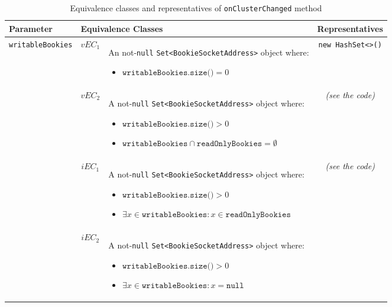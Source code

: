 \documentclass[sigconf]{acmart}
\begin{document}
\begin{table*}
\footnotesize
\caption{Equivalence classes and representatives of \texttt{onClusterChanged} method}
\label{onClusterChangedEq}
\centering
\begin{tabular}{l|cm{10.5cm}|c}
\toprule
 
\textbf{Parameter} & \multicolumn{2}{|l|}{\textbf{Equivalence Classes}} & \textbf{Representatives} \\
\midrule
    
\texttt{writableBookies} & $vEC_1$ & An not-\texttt{null} \texttt{Set<BookieSocketAddress>} object where:

\begin{itemize}
\item $\texttt{writableBookies.size()} = 0$
\end{itemize}

& \texttt{new HashSet<>()}

\\\cline{2-4}

& $vEC_2$ & A not-\texttt{null} \texttt{Set<BookieSocketAddress>} object where:
\begin{itemize}
\item $\texttt{writableBookies.size()} > 0$
\item $\texttt{writableBookies}  \cap \texttt{readOnlyBookies} = \emptyset$
\end{itemize}

& \textit{(see the code)}

\\\cline{2-4}

& $iEC_1$ & A not-\texttt{null} \texttt{Set<BookieSocketAddress>} object where:
\begin{itemize}
\item $\texttt{writableBookies.size()} > 0$
\item $\exists x \in \texttt{writableBookies} : x \in \texttt{readOnlyBookies}$
\end{itemize}

& \textit{(see the code)}

\\\cline{2-4}

& $iEC_2$ & A not-\texttt{null} \texttt{Set<BookieSocketAddress>} object where:
\begin{itemize}
\item $\texttt{writableBookies.size()} > 0$
\item $\exists x \in \texttt{writableBookies} : x = \texttt{null}$
\end{itemize}


\end{tabular}
\end{table*}
\end{document}
